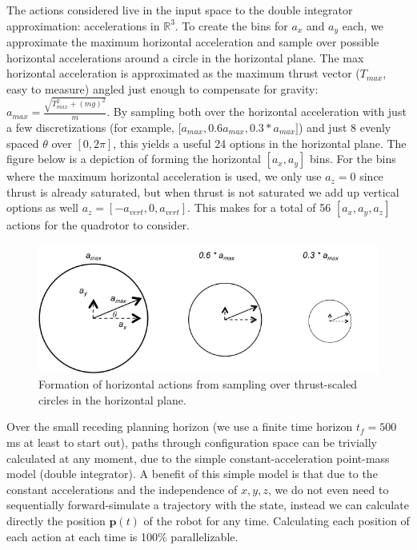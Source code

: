 \documentclass[paper=a4, fontsize=11pt]{scrartcl} %
\numberwithin{equation}{section} %
\numberwithin{figure}{section} %
\numberwithin{table}{section} %
\begin{document}
The actions considered live in the input space to the double integrator approximation: accelerations in $\mathbb{R}^3$.  To create the bins for $a_x$ and $a_y$ each, we approximate the maximum horizontal acceleration and sample over possible horizontal accelerations around a circle in the horizontal plane.   The max horizontal acceleration is approximated as the maximum thrust vector ($T_{max}$, easy to measure) angled just enough to compensate for gravity: $a_{max} = \frac{ \sqrt{ T_{max}^2 + (mg)^2}}{m}$.  By sampling both over the horizontal acceleration with just a few discretizations (for example, [$a_{max}, 0.6a_{max}, 0.3*a_{max} ]$) and just 8 evenly spaced $\theta$ over $[0, 2\pi]$, this yields a useful 24 options in the horizontal plane.  The figure below is a depiction of forming the horizontal $[a_x, a_y]$ bins.  For the bins where the maximum horizontal acceleration is used, we only use $a_z = 0$ since thrust is already saturated, but when thrust is not saturated we add up vertical options as well $a_z = [-a_{vert}, 0, a_{vert}]$. This makes for a total of 56 $[a_x, a_y, a_z]$ actions for the quadrotor to consider.\\

\begin{figure}
  \includegraphics[width=\linewidth]{horizontal_actions.png}
  \caption{Formation of horizontal actions from sampling over thrust-scaled circles in the horizontal plane.}
  \label{fig:boat1}
\end{figure}

Over the small receding planning horizon (we use a finite time horizon $t_f = 500$ ms at least to start out), paths through configuration space can be trivially calculated at any moment, due to the simple constant-acceleration point-mass model (double integrator).  A benefit of this simple model is that due to the constant accelerations and the independence of $x, y, z$, we do not even need to sequentially forward-simulate a trajectory with the state, instead we can calculate directly the position $\mathbf{p}(t)$ of the robot for any time.  Calculating each position of each action at each time is 100\% parallelizable.
\end{document}
